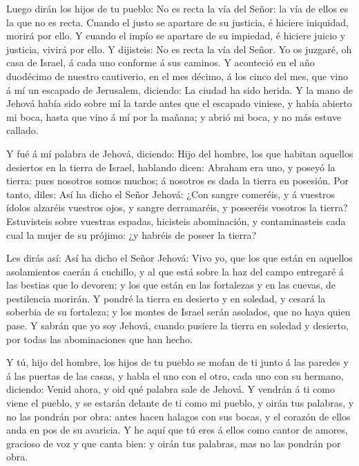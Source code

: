  Luego dirán los hijos de tu pueblo: No es recta la vía del
Señor: la vía de ellos es la que no es recta.  Cuando el
justo se apartare de su justicia, é hiciere iniquidad, morirá por ello.
 Y cuando el impío se apartare de su impiedad, é hiciere
juicio y justicia, vivirá por ello.  Y dijisteis: No es
recta la vía del Señor. Yo os juzgaré, oh casa de Israel, á cada uno
conforme á sus caminos.  Y aconteció en el año duodécimo de
nuestro cautiverio, en el mes décimo, á los cinco del mes, que vino á mí
un escapado de Jerusalem, diciendo: La ciudad ha sido herida.
 Y la mano de Jehová había sido sobre mí la tarde antes que
el escapado viniese, y había abierto mi boca, hasta que vino á mí por la
mañana; y abrió mi boca, y no más estuve callado.

 Y fué á mí palabra de Jehová, diciendo:  Hijo
del hombre, los que habitan aquellos desiertos en la tierra de Israel,
hablando dicen: Abraham era uno, y poseyó la tierra: pues nosotros somos
muchos; á nosotros es dada la tierra en posesión.  Por
tanto, diles: Así ha dicho el Señor Jehová: ¿Con sangre comeréis, y á
vuestros ídolos alzaréis vuestros ojos, y sangre derramaréis, y
poseeréis vosotros la tierra?  Estuvisteis sobre vuestras
espadas, hicisteis abominación, y contaminasteis cada cual la mujer de
su prójimo: ¿y habréis de poseer la tierra?

 Les dirás así: Así ha dicho el Señor Jehová: Vivo yo, que
los que están en aquellos asolamientos caerán á cuchillo, y al que está
sobre la haz del campo entregaré á las bestias que lo devoren; y los que
están en las fortalezas y en las cuevas, de pestilencia morirán.
 Y pondré la tierra en desierto y en soledad, y cesará la
soberbia de su fortaleza; y los montes de Israel serán asolados, que no
haya quien pase.  Y sabrán que yo soy Jehová, cuando
pusiere la tierra en soledad y desierto, por todas las abominaciones que
han hecho.

 Y tú, hijo del hombre, los hijos de tu pueblo se mofan de
ti junto á las paredes y á las puertas de las casas, y habla el uno con
el otro, cada uno con su hermano, diciendo: Venid ahora, y oid qué
palabra sale de Jehová.  Y vendrán á ti como viene el
pueblo, y se estarán delante de ti como mi pueblo, y oirán tus palabras,
y no las pondrán por obra: antes hacen halagos con sus bocas, y el
corazón de ellos anda en pos de su avaricia.  Y he aquí que
tú eres á ellos como cantor de amores, gracioso de voz y que canta bien:
y oirán tus palabras, mas no las pondrán por obra.

